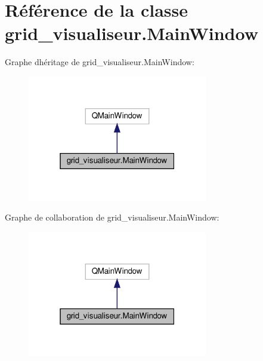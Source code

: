 \hypertarget{classgrid__visualiseur_1_1MainWindow}{}\section{Référence de la classe grid\+\_\+visualiseur.\+Main\+Window}
\label{classgrid__visualiseur_1_1MainWindow}


Graphe d\textquotesingle{}héritage de grid\+\_\+visualiseur.\+Main\+Window\+:
\nopagebreak
\begin{figure}[H]
\begin{center}
\leavevmode
\includegraphics[width=223pt]{classgrid__visualiseur_1_1MainWindow__inherit__graph}
\end{center}
\end{figure}


Graphe de collaboration de grid\+\_\+visualiseur.\+Main\+Window\+:
\nopagebreak
\begin{figure}[H]
\begin{center}
\leavevmode
\includegraphics[width=223pt]{classgrid__visualiseur_1_1MainWindow__coll__graph}
\end{center}
\end{figure}
